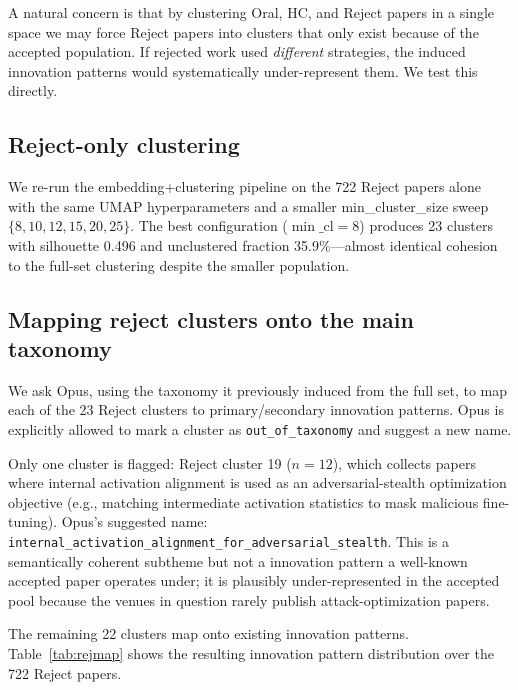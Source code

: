 \documentclass[10pt,a4paper]{article}
\begin{document}
A natural concern is that by clustering Oral, HC, and Reject papers in a single space we may force Reject papers into clusters that only exist because of the accepted population. If rejected work used \emph{different} strategies, the induced innovation patterns would systematically under-represent them. We test this directly.

\subsection{Reject-only clustering}

We re-run the embedding+clustering pipeline on the 722 Reject papers alone with the same UMAP hyperparameters and a smaller min\_cluster\_size sweep $\{8,10,12,15,20,25\}$. The best configuration ($\min\_\text{cl}{=}8$) produces 23 clusters with silhouette 0.496 and unclustered fraction 35.9\%---almost identical cohesion to the full-set clustering despite the smaller population.

\subsection{Mapping reject clusters onto the main taxonomy}

We ask Opus, using the taxonomy it previously induced from the full set, to map each of the 23 Reject clusters to primary/secondary innovation patterns. Opus is explicitly allowed to mark a cluster as \texttt{out\_of\_taxonomy} and suggest a new name.

Only one cluster is flagged: Reject cluster 19 ($n{=}12$), which collects papers where internal activation alignment is used as an adversarial-stealth optimization objective (e.g., matching intermediate activation statistics to mask malicious fine-tuning). Opus's suggested name: \texttt{internal\_activation\_alignment\_for\_adversarial\_stealth}. This is a semantically coherent subtheme but not a innovation pattern a well-known accepted paper operates under; it is plausibly under-represented in the accepted pool because the venues in question rarely publish attack-optimization papers.

The remaining 22 clusters map onto existing innovation patterns. Table~\ref{tab:rejmap} shows the resulting innovation pattern distribution over the 722 Reject papers.
\end{document}
